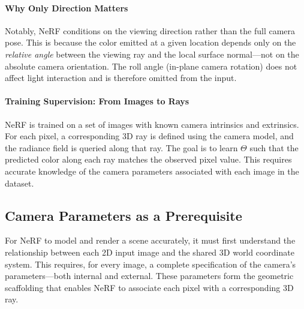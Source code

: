 \newpage 

\paragraph{Why Only Direction Matters}
Notably, NeRF conditions on the viewing direction rather than the full camera pose. This is because the color emitted at a given location depends only on the \emph{relative angle} between the viewing ray and the local surface normal—not on the absolute camera orientation. The roll angle (in-plane camera rotation) does not affect light interaction and is therefore omitted from the input.

\paragraph{Training Supervision: From Images to Rays}
NeRF is trained on a set of images with known camera intrinsics and extrinsics. For each pixel, a corresponding 3D ray is defined using the camera model, and the radiance field is queried along that ray. The goal is to learn \(\Theta\) such that the predicted color along each ray matches the observed pixel value. This requires accurate knowledge of the camera parameters associated with each image in the dataset.

\subsection{Camera Parameters as a Prerequisite}%
\label{subsec:chapter23_nerf_camera_params}

For NeRF to model and render a scene accurately, it must first understand the relationship between each 2D input image and the shared 3D world coordinate system. This requires, for every image, a complete specification of the camera’s parameters—both internal and external. These parameters form the geometric scaffolding that enables NeRF to associate each pixel with a corresponding 3D ray.

